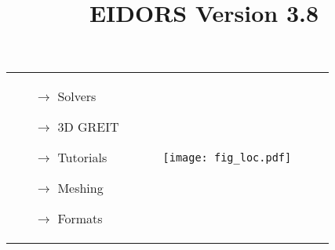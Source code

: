 \documentclass[20pt,a4paper]{article}
\title{EIDORS Version 3.8%
\vspace{-2ex}} %
\date{}
\begin{document}
\thispagestyle{empty}


\begin{tabular}{p{75mm} p{10cm}}
{\fontsize{35}{45}\selectfont
\begin{itemize}
\setlist{noitemsep}
\setlist{nolistsep}
\item[$\rightarrow$] Solvers
\item[$\rightarrow$] 3D GREIT 
\item[$\rightarrow$] Tutorials
\item[$\rightarrow$] Meshing\hspace{-1cm}
\item[$\rightarrow$] Formats
\end{itemize}
}
 &
\begin{figure}[H]
\texttt{[image: fig\_loc.pdf]}
\end{figure}
\end{tabular}
\end{document}
